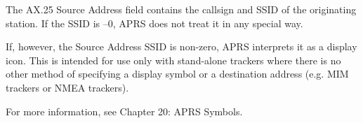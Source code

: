 The AX.25 Source Address field contains the callsign and SSID of the
originating station. If the SSID is –0, APRS does not treat it in any special
way.

If, however, the Source Address SSID is non-zero, APRS interprets it as a
display icon. This is intended for use only with stand-alone trackers where
there is no other method of specifying a display symbol or a destination
address (e.g. MIM trackers or NMEA trackers).

For more information, see Chapter 20: APRS Symbols.
